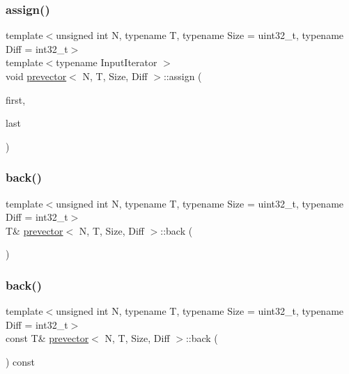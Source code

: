 \subsubsection{\texorpdfstring{assign()}{assign()}\hspace{0.1cm}{\footnotesize\ttfamily [2/2]}}
{\footnotesize\ttfamily template$<$unsigned int N, typename T, typename Size = uint32\+\_\+t, typename Diff = int32\+\_\+t$>$ \\
template$<$typename Input\+Iterator $>$ \\
void \mbox{\hyperlink{classprevector}{prevector}}$<$ N, T, Size, Diff $>$\+::assign (\begin{DoxyParamCaption}\item[{Input\+Iterator}]{first,  }\item[{Input\+Iterator}]{last }\end{DoxyParamCaption})\hspace{0.3cm}{\ttfamily [inline]}}

\mbox{\label{classprevector_a9ff352b7b4f87eb70f0e79547d6f5314}} 
\subsubsection{\texorpdfstring{back()}{back()}\hspace{0.1cm}{\footnotesize\ttfamily [1/2]}}
{\footnotesize\ttfamily template$<$unsigned int N, typename T, typename Size = uint32\+\_\+t, typename Diff = int32\+\_\+t$>$ \\
T\& \mbox{\hyperlink{classprevector}{prevector}}$<$ N, T, Size, Diff $>$\+::back (\begin{DoxyParamCaption}{ }\end{DoxyParamCaption})\hspace{0.3cm}{\ttfamily [inline]}}

\mbox{\label{classprevector_a5ae4f96ce4f204e135ffd88f2028c128}} 
\subsubsection{\texorpdfstring{back()}{back()}\hspace{0.1cm}{\footnotesize\ttfamily [2/2]}}
{\footnotesize\ttfamily template$<$unsigned int N, typename T, typename Size = uint32\+\_\+t, typename Diff = int32\+\_\+t$>$ \\
const T\& \mbox{\hyperlink{classprevector}{prevector}}$<$ N, T, Size, Diff $>$\+::back (\begin{DoxyParamCaption}{ }\end{DoxyParamCaption}) const\hspace{0.3cm}{\ttfamily [inline]}}

